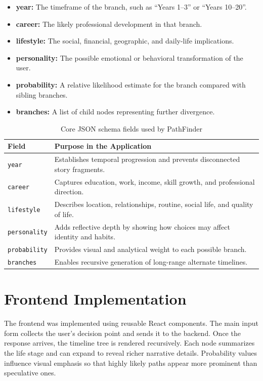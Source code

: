 \documentclass[12pt,a4paper]{report}
\begin{document}
\begin{itemize}
    \item \textbf{year:} The timeframe of the branch, such as ``Years 1--3'' or ``Years 10--20''.
    \item \textbf{career:} The likely professional development in that branch.
    \item \textbf{lifestyle:} The social, financial, geographic, and daily-life implications.
    \item \textbf{personality:} The possible emotional or behavioral transformation of the user.
    \item \textbf{probability:} A relative likelihood estimate for the branch compared with sibling branches.
    \item \textbf{branches:} A list of child nodes representing further divergence.
\end{itemize}

\begin{table}[h]
    \centering
    \renewcommand{\arraystretch}{1.5}
    \begin{tabular}{@{}p{} p{}@{}}
    \toprule
    \textbf{Field} & \textbf{Purpose in the Application} \\
    \midrule
    \texttt{year} & Establishes temporal progression and prevents disconnected story fragments. \\
    \texttt{career} & Captures education, work, income, skill growth, and professional direction. \\
    \texttt{lifestyle} & Describes location, relationships, routine, social life, and quality of life. \\
    \texttt{personality} & Adds reflective depth by showing how choices may affect identity and habits. \\
    \texttt{probability} & Provides visual and analytical weight to each possible branch. \\
    \texttt{branches} & Enables recursive generation of long-range alternate timelines. \\
    \bottomrule
    \end{tabular}
    \caption{Core JSON schema fields used by PathFinder}
\end{table}

\section{Frontend Implementation}
The frontend was implemented using reusable React components. The main input form collects the user's decision point and sends it to the backend. Once the response arrives, the timeline tree is rendered recursively. Each node summarizes the life stage and can expand to reveal richer narrative details. Probability values influence visual emphasis so that highly likely paths appear more prominent than speculative ones.
\end{document}
